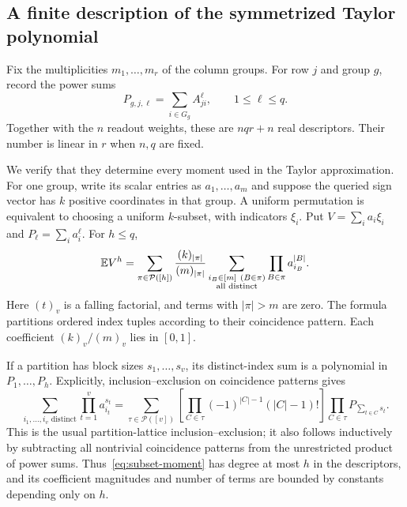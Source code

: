 \subsection{A finite description of the symmetrized Taylor polynomial}
Fix the multiplicities $m_1,\ldots,m_r$ of the column groups. For row $j$ and group $g$, record the power sums
\[
 P_{g,j,\ell}=\sum_{i\in G_g} A_{ji}^{\ell},\qquad 1\le\ell\le q.
\]
Together with the $n$ readout weights, these are $nqr+n$ real descriptors. Their number is linear in $r$ when $n,q$ are fixed.

We verify that they determine every moment used in the Taylor approximation. For one group, write its scalar entries as $a_1,\ldots,a_m$ and suppose the queried sign vector has $k$ positive coordinates in that group. A uniform permutation is equivalent to choosing a uniform $k$-subset, with indicators $\xi_i$. Put $V=\sum_i a_i\xi_i$ and $P_\ell=\sum_i a_i^\ell$. For $h\le q$,
\begin{equation}\label{eq:subset-moment}
 \mathbb E V^h=\sum_{\pi\in\mathcal P([h])}
 \frac{(k)_{|\pi|}}{(m)_{|\pi|}}
 \sum_{\substack{i_B\in[m]\ (B\in\pi)\\\text{all distinct}}}
       \prod_{B\in\pi}a_{i_B}^{|B|}.
\end{equation}
Here $(t)_v$ is a falling factorial, and terms with $|\pi|>m$ are zero. The formula partitions ordered index tuples according to their coincidence pattern. Each coefficient $(k)_v/(m)_v$ lies in $[0,1]$.

If a partition has block sizes $s_1,\ldots,s_v$, its distinct-index sum is a polynomial in $P_1,\ldots,P_h$. Explicitly, inclusion--exclusion on coincidence patterns gives
\begin{equation}\label{eq:distinct-powers}
 \sum_{i_1,\ldots,i_v\text{ distinct}}\prod_{t=1}^v a_{i_t}^{s_t}
 =\sum_{\tau\in\mathcal P([v])}
   \left[\prod_{C\in\tau}(-1)^{|C|-1}(|C|-1)!\right]
   \prod_{C\in\tau}P_{\sum_{t\in C}s_t}.
\end{equation}
This is the usual partition-lattice inclusion--exclusion; it also follows inductively by subtracting all nontrivial coincidence patterns from the unrestricted product of power sums. Thus~\eqref{eq:subset-moment} has degree at most $h$ in the descriptors, and its coefficient magnitudes and number of terms are bounded by constants depending only on $h$.

